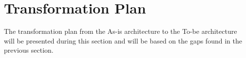 \section{Transformation Plan}
\label{sec:transformation_plan}
The transformation plan from the As-is architecture to the To-be architecture will be presented during this section and will be based on the gaps found in the previous section.